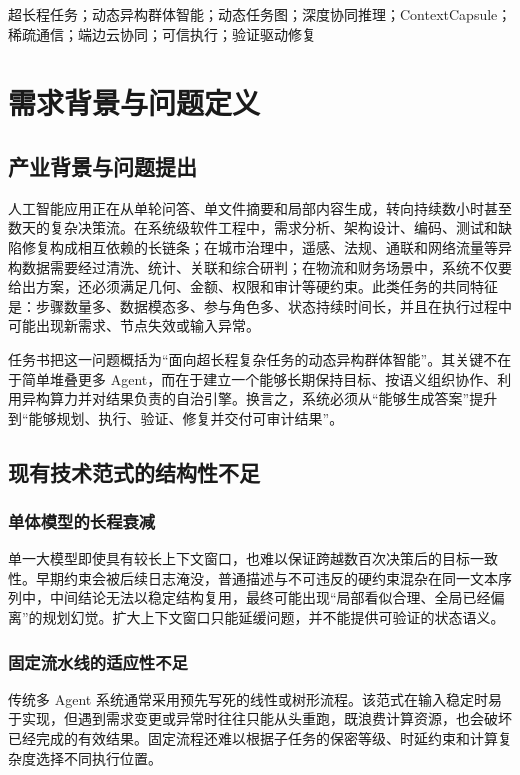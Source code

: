 \documentclass[UTF8,a4paper,12pt,oneside]{ctexbook}
\begin{document}
超长程任务；动态异构群体智能；动态任务图；深度协同推理；ContextCapsule；稀疏通信；端边云协同；可信执行；验证驱动修复

\tableofcontents

\mainmatter

\chapter{需求背景与问题定义}
\section{产业背景与问题提出}
人工智能应用正在从单轮问答、单文件摘要和局部内容生成，转向持续数小时甚至数天的复杂决策流。在系统级软件工程中，需求分析、架构设计、编码、测试和缺陷修复构成相互依赖的长链条；在城市治理中，遥感、法规、通联和网络流量等异构数据需要经过清洗、统计、关联和综合研判；在物流和财务场景中，系统不仅要给出方案，还必须满足几何、金额、权限和审计等硬约束。此类任务的共同特征是：步骤数量多、数据模态多、参与角色多、状态持续时间长，并且在执行过程中可能出现新需求、节点失效或输入异常。

任务书把这一问题概括为“面向超长程复杂任务的动态异构群体智能”。其关键不在于简单堆叠更多 Agent，而在于建立一个能够长期保持目标、按语义组织协作、利用异构算力并对结果负责的自治引擎。换言之，系统必须从“能够生成答案”提升到“能够规划、执行、验证、修复并交付可审计结果”。

\section{现有技术范式的结构性不足}
\subsection{单体模型的长程衰减}
单一大模型即使具有较长上下文窗口，也难以保证跨越数百次决策后的目标一致性。早期约束会被后续日志淹没，普通描述与不可违反的硬约束混杂在同一文本序列中，中间结论无法以稳定结构复用，最终可能出现“局部看似合理、全局已经偏离”的规划幻觉。扩大上下文窗口只能延缓问题，并不能提供可验证的状态语义。

\subsection{固定流水线的适应性不足}
传统多 Agent 系统通常采用预先写死的线性或树形流程。该范式在输入稳定时易于实现，但遇到需求变更或异常时往往只能从头重跑，既浪费计算资源，也会破坏已经完成的有效结果。固定流程还难以根据子任务的保密等级、时延约束和计算复杂度选择不同执行位置。
\end{document}
